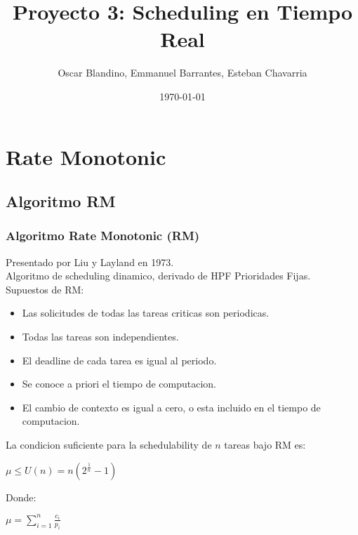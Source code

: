 \documentclass[xcolor=table]{beamer}
\title[Proyecto 3]{Proyecto 3: Scheduling en Tiempo Real} %
\author{Oscar Blandino, Emmanuel Barrantes, Esteban Chavarria} %
\institute[TEC] %
{
Tecnologico de Costa Rica \\ %
Sistemas Operativos Avanzados \\
I Semestre - 2018
\medskip
\textit{} %
}
\date{\today} %
\begin{document}
\begin{frame}
\titlepage %
\end{frame}



\section{Rate Monotonic}

\subsection{Algoritmo RM}

\begin{frame} 
\frametitle{Algoritmo Rate Monotonic (RM)} 

Presentado por Liu y Layland en 1973. \\
Algoritmo de scheduling dinamico, derivado de HPF Prioridades Fijas. \\
Supuestos de RM:
\begin{itemize}
\item Las solicitudes de todas las tareas criticas son periodicas.
\item Todas las tareas son independientes.
\item El deadline de cada tarea es igual al periodo.
\item Se conoce a priori el tiempo de computacion.
\item El cambio de contexto es igual a cero, o esta incluido en el tiempo de computacion.
\end{itemize} 

La condicion suficiente para la schedulability de $n$ tareas bajo RM es:
\begin{center}
$\mu \leq U(n) = n(2^{\frac{1}{n}}-1)$
\end{center}

Donde:
\begin{center}
$\mu = \sum_{i=1}^{n}\frac{c_i}{p_i}$
\end{center}

\end{frame}
\end{document}
